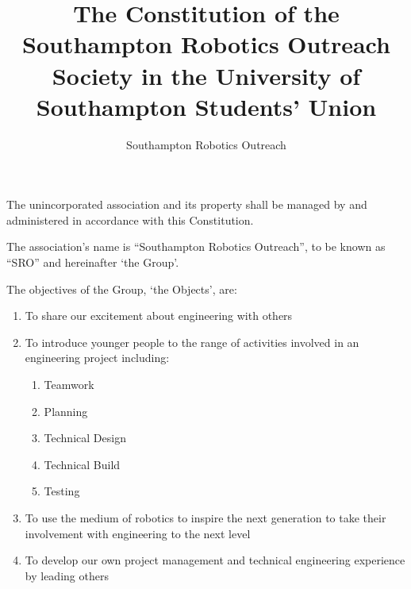 \documentclass[12pt]{constitution}
\begin{document}

\title{The Constitution of the Southampton Robotics Outreach Society in the University of Southampton Students' Union}
\author{Southampton Robotics Outreach}
\maketitle


\label{article:adoption-constitution}

The unincorporated association and its property shall be managed by and administered in accordance with this Constitution.


\label{article:name}

The association's name is ``Southampton Robotics Outreach'', to be known as ``SRO'' and hereinafter `the Group'.


\label{article:objects}

The objectives of the Group, `the Objects', are:

\begin{enumerate}
    \item To share our excitement about engineering with others
    \item To introduce younger people to the range of activities involved in an engineering project including:
    \begin{enumerate}
        \item Teamwork
        \item Planning
        \item Technical Design
        \item Technical Build
        \item Testing
    \end{enumerate}
    \item To use the medium of robotics to inspire the next generation to take their involvement with engineering to the next level
    \item To develop our own project management and technical engineering experience by leading others
\end{enumerate}

\end{document}
